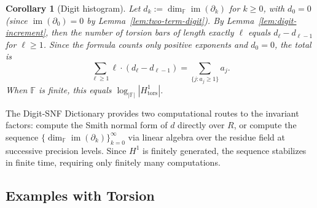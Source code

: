 \documentclass[11pt]{amsart}
\theoremstyle{plain}
\newtheorem{corollary}[theorem]{Corollary}
\theoremstyle{definition}
\newcommand{\Ring}{R}                          %
\newcommand{\tors}{\mathrm{tors}}
\newcommand{\Digit}[1]{\partial_{#1}}%
\newcommand{\coboundary}{d}                           %
\DeclareMathOperator{\im}{im}                         %
\begin{document}
\begin{corollary}[Digit histogram]
\label{cor:digit-hist}
Let $d_k := \dim_{\mathbb{F}}\im(\Digit{k})$ for $k \ge 0$, with $d_0 = 0$ (since $\im(\Digit{0}) = 0$ by Lemma~\ref{lem:two-term-digit}). By Lemma~\ref{lem:digit-increment}, then the number of torsion bars of length exactly $\ell$ equals $d_\ell - d_{\ell-1}$ for $\ell \ge 1$. Since the formula counts only positive exponents and $d_0 = 0$, the total is
\[
\sum_{\ell \ge 1} \ell \cdot (d_\ell - d_{\ell-1}) = \sum_{\{j: a_j \ge 1\}} a_j.
\]
When $\mathbb{F}$ is finite, this equals $\log_{|\mathbb{F}|}|H^1_{\tors}|$.
\end{corollary}

The Digit-SNF Dictionary provides two computational routes to the invariant factors: 
compute the Smith normal form of $\coboundary$ directly over $\Ring$, or compute 
the sequence $\{\dim_{\mathbb{F}} \im(\Digit{k})\}_{k=0}^{\infty}$ via linear 
algebra over the residue field at successive precision levels. Since $H^1$ is 
finitely generated, the sequence stabilizes in finite time, requiring only finitely 
many computations.

\subsection{Examples with Torsion}
\label{ssec:triangle-example}
\end{document}
